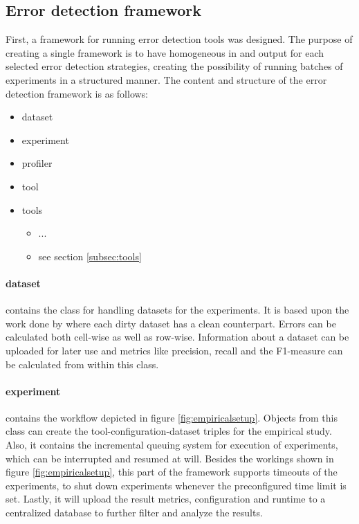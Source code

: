 \subsection{Error detection framework}
First, a framework for running error detection tools was designed. The purpose of creating a single framework is to have homogeneous in and output for each selected error detection strategies, creating the possibility of running batches of experiments in a structured manner. 
The content and structure of the error detection framework is as follows:
\begin{itemize}[label=]
\item dataset
\item experiment
\item profiler
\item tool
\item tools
    \begin{itemize}[label=]
        \item ...
        \item see section \ref{subsec:tools}
    \end{itemize}
\end{itemize}

\paragraph{dataset} contains the class for handling datasets for the experiments. It is based upon the work done by \cite{Mahdavi2019-zf} where each dirty dataset has a clean counterpart. Errors can be calculated both cell-wise as well as row-wise. Information about a dataset can be uploaded for later use and metrics like precision, recall and the F1-measure can be calculated from within this class.

\paragraph{experiment} contains the workflow depicted in figure \ref{fig:empiricalsetup}. Objects from this class can create the tool-configuration-dataset triples for the empirical study. Also, it contains the incremental queuing system for execution of experiments, which can be interrupted and resumed at will. Besides the workings shown in figure \ref{fig:empiricalsetup}, this part of the framework supports timeouts of the experiments, to shut down experiments whenever the preconfigured time limit is set. Lastly, it will upload the result metrics, configuration and runtime to a centralized database to further filter and analyze the results.

